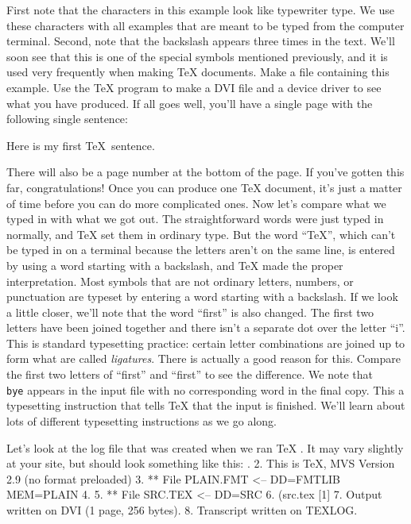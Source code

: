  
First note that the characters in this example look like 
typewriter type. We use these characters with all examples that 
are meant to be typed from the computer terminal. Second, note 
that the backslash appears three times in the text. We'll soon 
see that this is one of the special symbols mentioned 
previously, and it is used very frequently when making \TeX{} 
documents. Make a file containing this example. Use the \TeX{} 
program to make a DVI file and a device driver to see what you 
have produced. If all goes well, you'll have a single page with 
the following single sentence: 
 
Here is my first \TeX\ sentence. 
 
  There will also be a page number at the bottom of the page. If 
you've gotten this far, congratulations! Once you can produce one 
\TeX{} document, it's just a matter of time before you can do 
more complicated ones. Now let's compare what we typed in with 
what we got out. The straightforward words were just typed in 
normally, and \TeX{} set them in ordinary type. But the word ``\TeX'', 
which can't be typed in on a terminal because the letters 
aren't on the same line, is entered by using a word starting with 
a backslash, and \TeX{} made the proper interpretation. Most 
symbols that are not ordinary letters, numbers, or punctuation 
are typeset by entering a word starting with a backslash. If we 
look a little closer, we'll note that the word ``first'' is also 
changed. 
The first two letters have been joined together and there isn't 
a separate dot over the letter ``i''. This is standard 
typesetting practice: certain letter combinations are joined up 
to form what are called {\sl ligatures}. There is actually a good 
\aesthetic{} reason for this. Compare the first two letters of 
``first'' and ``{f}irst'' to see the difference. We note that 
{\tt \\bye} appears in the input file with no corresponding word 
in the final copy. 
This a typesetting instruction that tells \TeX{} that the input 
is finished. We'll learn about lots of different typesetting 
instructions as we go along. 
 
Let's look at the log file that was created when we ran \TeX 
\null. It may vary slightly at your site, but should look 
something like this: 
. 
   2.  This is TeX, MVS Version 2.9 (no format preloaded) 
   3.   ** File  PLAIN.FMT <-- DD=FMTLIB MEM=PLAIN 
   4. 
   5.   ** File  SRC.TEX <-- DD=SRC 
   6.  (src.tex [1] 
   7.  Output written on DVI (1 page, 256 bytes). 
   8.  Transcript written on TEXLOG. 
\enduser 
 
